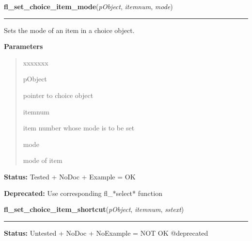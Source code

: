 \hspace{.8\funcindent}\begin{boxedminipage}{\funcwidth}

    \raggedright \textbf{fl\_set\_choice\_item\_mode}(\textit{pObject}, \textit{itemnum}, \textit{mode})

    \vspace{-1.5ex}

    \rule{\textwidth}{0.5\fboxrule}
\setlength{\parskip}{2ex}
    Sets the mode of an item in a choice object.

\setlength{\parskip}{1ex}
      \textbf{Parameters}
      \vspace{-1ex}

      \begin{quote}
        \begin{Ventry}{xxxxxxx}

          \item[pObject]

          pointer to choice object

          \item[itemnum]

          item number whose mode is to be set

          \item[mode]

          mode of item

        \end{Ventry}

      \end{quote}

\textbf{Status:} Tested + NoDoc + Example = OK



\textbf{Deprecated:} Use corresponding fl\_*select* function



    \end{boxedminipage}

    \label{xformslib:deprecated:fl_set_choice_item_shortcut}

    \vspace{0.5ex}

\hspace{.8\funcindent}\begin{boxedminipage}{\funcwidth}

    \raggedright \textbf{fl\_set\_choice\_item\_shortcut}(\textit{pObject}, \textit{itemnum}, \textit{sstext})

    \vspace{-1.5ex}

    \rule{\textwidth}{0.5\fboxrule}
\setlength{\parskip}{2ex}
\setlength{\parskip}{1ex}
\textbf{Status:} Untested + NoDoc + NoExample = NOT OK @deprecated



    \end{boxedminipage}

